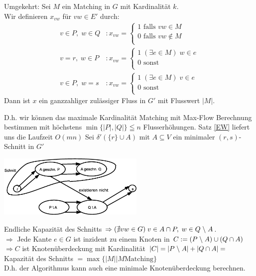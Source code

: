 Umgekehrt: Sei $M$ ein Matching in $G$ mit Kardinalität $k$.\\
Wir definieren $x_{v w}$ für $v w \in E'$ durch:
\[\begin{array}{ll}
v \in P , \; w \in Q&: x_{v w} = \left\{\begin{array}{l}
1 \mbox{ falls } v w \in M\\
0 \mbox{ falls } v w \not\in M\\
\end{array} \right.\\
v = r, \; w \in P&: x_{v w} = \left\{\begin{array}{l}
1\; (\exists e \in M) \; w \in e\\
0 \mbox{ sonst}\\
\end{array} \right.\\
v \in P, \; w=s&: x_{v w} = \left\{\begin{array}{l}
1\; (\exists e \in M) \; v \in e\\
0 \mbox{ sonst}\\
\end{array} \right.
\end{array}
\]
Dann ist $x$ ein ganzzahliger zulässiger Fluss in $G'$ mit Flusswert $|M|$.

D.h. wir können das maximale Kardinalität Matching mit Max-Flow Berechnung
bestimmen mit höchstens $\min \{|P|,|Q|\} \leqq n$ Flusserhöhungen. Satz
\ref{EW} liefert uns die Laufzeit $O(m n)$ Sei $\delta'(\{r\} \cup A)$ mit
$A \subseteq V$ ein minimaler $(r,s)$-Schnitt in $G'$

\includegraphics[height=3cm]{bilder/3-0MinKnotenueber}

Endliche Kapazität des Schnitts $\Rightarrow (\nexists v w \in G) \; v
\in  A \cap P, \; w \in Q \;\backslash\; A$.\\
$\Rightarrow$ Jede Kante $e \in G$ ist inzident zu einem Knoten in $C := (P
\;\backslash\; A) \cup (Q \cap A)$\\
$\Rightarrow C$ ist Knotenüberdeckung mit Kardinalität $|C| = |P \;\backslash\;
A| + | Q \cap A| = $ Kapazität des Schnitts $= \max \{|M|| M \mbox{
Matching} \}$\\
D.h. der Algorithmus kann auch eine minimale Knotenüberdeckung berechnen. 

